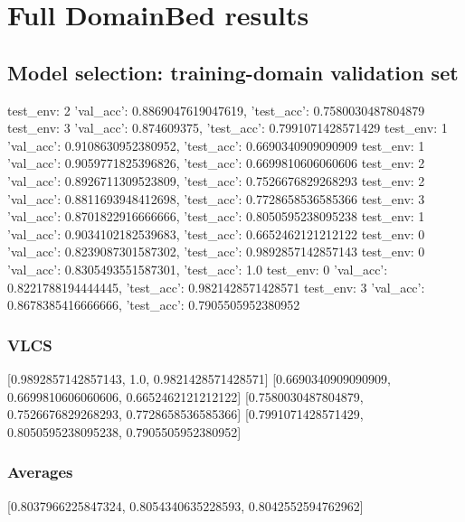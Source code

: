 \documentclass{article}
\begin{document}
\section{Full DomainBed results}

\subsection{Model selection: training-domain validation set}
test_env: 2
{'val_acc': 0.8869047619047619, 'test_acc': 0.7580030487804879}
test_env: 3
{'val_acc': 0.874609375, 'test_acc': 0.7991071428571429}
test_env: 1
{'val_acc': 0.9108630952380952, 'test_acc': 0.6690340909090909}
test_env: 1
{'val_acc': 0.9059771825396826, 'test_acc': 0.6699810606060606}
test_env: 2
{'val_acc': 0.8926711309523809, 'test_acc': 0.7526676829268293}
test_env: 2
{'val_acc': 0.8811693948412698, 'test_acc': 0.7728658536585366}
test_env: 3
{'val_acc': 0.8701822916666666, 'test_acc': 0.8050595238095238}
test_env: 1
{'val_acc': 0.9034102182539683, 'test_acc': 0.6652462121212122}
test_env: 0
{'val_acc': 0.8239087301587302, 'test_acc': 0.9892857142857143}
test_env: 0
{'val_acc': 0.8305493551587301, 'test_acc': 1.0}
test_env: 0
{'val_acc': 0.8221788194444445, 'test_acc': 0.9821428571428571}
test_env: 3
{'val_acc': 0.8678385416666666, 'test_acc': 0.7905505952380952}

\subsubsection{VLCS}
[0.9892857142857143, 1.0, 0.9821428571428571]
[0.6690340909090909, 0.6699810606060606, 0.6652462121212122]
[0.7580030487804879, 0.7526676829268293, 0.7728658536585366]
[0.7991071428571429, 0.8050595238095238, 0.7905505952380952]

\begin{center}
\end{center}

\subsubsection{Averages}
[0.8037966225847324, 0.8054340635228593, 0.8042552594762962]

\begin{center}
\end{center}
\end{document}
